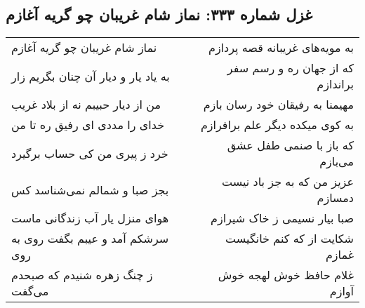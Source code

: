 \begin{center}
\section*{غزل شماره ۳۳۳: نماز شام غریبان چو گریه آغازم}
\label{sec:sh333}
\begin{longtable}{l p{0.5cm} r}
نماز شام غریبان چو گریه آغازم
&&
به مویه‌های غریبانه قصه پردازم
\\
به یاد یار و دیار آن چنان بگریم زار
&&
که از جهان ره و رسم سفر براندازم
\\
من از دیار حبیبم نه از بلاد غریب
&&
مهیمنا به رفیقان خود رسان بازم
\\
خدای را مددی ای رفیق ره تا من
&&
به کوی میکده دیگر علم برافرازم
\\
خرد ز پیری من کی حساب برگیرد
&&
که باز با صنمی طفل عشق می‌بازم
\\
بجز صبا و شمالم نمی‌شناسد کس
&&
عزیز من که به جز باد نیست دمسازم
\\
هوای منزل یار آب زندگانی ماست
&&
صبا بیار نسیمی ز خاک شیرازم
\\
سرشکم آمد و عیبم بگفت روی به روی
&&
شکایت از که کنم خانگیست غمازم
\\
ز چنگ زهره شنیدم که صبحدم می‌گفت
&&
غلام حافظ خوش لهجه خوش آوازم
\\
\end{longtable}
\end{center}
